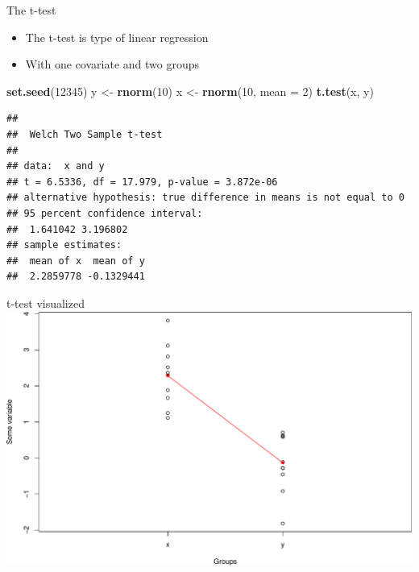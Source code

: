 \documentclass[
  ignorenonframetext,
]{beamer}
\newenvironment{Shaded}{\begin{snugshade}}{\end{snugshade}}
\newcommand{\AttributeTok}[1]{\textcolor[rgb]{0.13,0.29,0.53}{#1}}
\newcommand{\DecValTok}[1]{\textcolor[rgb]{0.00,0.00,0.81}{#1}}
\newcommand{\FunctionTok}[1]{\textcolor[rgb]{0.13,0.29,0.53}{\textbf{#1}}}
\newcommand{\NormalTok}[1]{#1}
\newcommand{\OtherTok}[1]{\textcolor[rgb]{0.56,0.35,0.01}{#1}}
\providecommand{\tightlist}{%
  \setlength{\itemsep}{0pt}\setlength{\parskip}{0pt}}
\begin{document}
\begin{frame}[fragile]{The t-test}
\protect\hypertarget{the-t-test}{}
\begin{itemize}
\tightlist
\item
  The t-test is type of linear regression
\item
  With one covariate and two groups
\end{itemize}

\tiny

\begin{codebox}

\begin{Shaded}
\begin{Highlighting}[]
\FunctionTok{set.seed}\NormalTok{(}\DecValTok{12345}\NormalTok{)}
\NormalTok{y }\OtherTok{\textless{}{-}} \FunctionTok{rnorm}\NormalTok{(}\DecValTok{10}\NormalTok{)}
\NormalTok{x }\OtherTok{\textless{}{-}} \FunctionTok{rnorm}\NormalTok{(}\DecValTok{10}\NormalTok{, }\AttributeTok{mean =} \DecValTok{2}\NormalTok{)}
\FunctionTok{t.test}\NormalTok{(x, y)}
\end{Highlighting}
\end{Shaded}

\end{codebox}

\begin{codebox}

\begin{verbatim}
## 
##  Welch Two Sample t-test
## 
## data:  x and y
## t = 6.5336, df = 17.979, p-value = 3.872e-06
## alternative hypothesis: true difference in means is not equal to 0
## 95 percent confidence interval:
##  1.641042 3.196802
## sample estimates:
##  mean of x  mean of y 
##  2.2859778 -0.1329441
\end{verbatim}

\end{codebox}

\normalsize
\end{frame}

\begin{frame}{t-test visualized}
\protect\hypertarget{t-test-visualized}{}
\includegraphics{IntroLM_files/figure-beamer/unnamed-chunk-7-1.pdf}
\end{frame}
\end{document}
